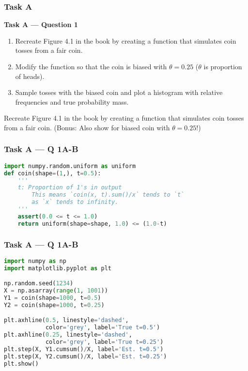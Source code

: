 \documentclass[usenames,dvipsnames]{beamer}
\begin{document}
\begin{frame}[fragile]
\frametitle{Task A}

\textbf{Task A --- Question 1}
\begin{enumerate}[label=\alph*]
\item Recreate Figure 4.1 in the book by creating a function that simulates coin tosses from a fair coin.
\item Modify the function so that the coin is biased with $\theta=0.25$ ($\theta$ is proportion of heads).
\item Sample tosses with the biased coin and plot a histogram with relative frequencies and true probability mass.
\end{enumerate}
\end{frame}


\begin{frame}
Recreate Figure 4.1 in the book by creating a function that simulates coin tosses from a fair coin.
(Bonus: Also show for biased coin with $\theta=0.25$!)
\end{frame}

\begin{frame}[fragile]
\frametitle{Task A --- Q 1A-B}
\begin{lstlisting}[language=Python]
import numpy.random.uniform as uniform
def coin(shape=(1,), t=0.5):
    '''
    t: Proportion of 1's in output
        This means `coin(x, t).sum()/x` tends to `t`
        as `x` tends to infinity.
    '''
    assert(0.0 <= t <= 1.0)
    return uniform(shape=shape, 1.0) <= (1.0-t)
\end{lstlisting}
\end{frame}



\begin{frame}[fragile]
\frametitle{Task A --- Q 1A-B}
\begin{lstlisting}[language=Python]
import numpy as np
import matplotlib.pyplot as plt

np.random.seed(1234)
X = np.asarray(range(1, 1001))
Y1 = coin(shape=1000, t=0.5)
Y2 = coin(shape=1000, t=0.25)

plt.axhline(0.5, linestyle='dashed',
            color='grey', label='True t=0.5')
plt.axhline(0.25, linestyle='dashed',
            color='grey', label='True t=0.25')
plt.step(X, Y1.cumsum()/X, label='Est. t=0.5')
plt.step(X, Y2.cumsum()/X, label='Est. t=0.25')
plt.show()
\end{lstlisting}
\end{frame}
\end{document}
